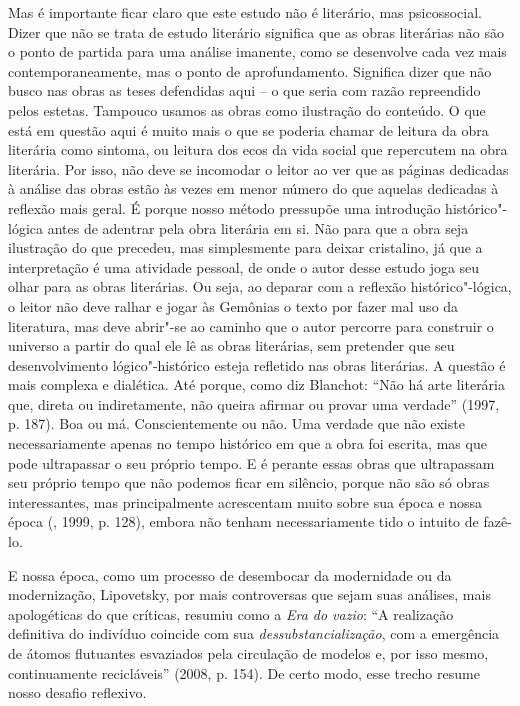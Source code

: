 Mas é importante ficar claro que este estudo não é literário, mas
psicossocial. Dizer que não se trata de estudo literário significa que
as obras literárias não são o ponto de partida para uma análise
imanente, como se desenvolve cada vez mais contemporaneamente, mas o
ponto de aprofundamento. Significa dizer que não busco nas obras as
teses defendidas aqui -- o que seria com razão repreendido pelos
estetas. Tampouco usamos as obras como ilustração do conteúdo. O que
está em questão aqui é muito mais o que se poderia chamar de leitura da
obra literária como sintoma, ou leitura dos ecos da vida social que
repercutem na obra literária. Por isso, não deve se incomodar o leitor
ao ver que as páginas dedicadas à análise das obras estão às vezes em
menor número do que aquelas dedicadas à reflexão mais geral. É porque
nosso método pressupõe uma introdução histórico"-lógica antes de adentrar
pela obra literária em si. Não para que a obra seja ilustração do que
precedeu, mas simplesmente para deixar cristalino, já que a
interpretação é uma atividade pessoal, de onde o autor desse estudo joga
seu olhar para as obras literárias. Ou seja, ao deparar com a reflexão
histórico"-lógica, o leitor não deve ralhar e jogar às Gemônias o texto
por fazer mal uso da literatura, mas deve abrir"-se ao caminho que o
autor percorre para construir o universo a partir do qual ele lê as
obras literárias, sem pretender que seu desenvolvimento lógico"-histórico
esteja refletido nas obras literárias. A questão é mais complexa e
dialética. Até porque, como diz Blanchot: ``Não há arte literária que,
direta ou indiretamente, não queira afirmar ou provar uma verdade''
(1997, p. 187). Boa ou má. Conscientemente ou não. Uma verdade que não
existe necessariamente apenas no tempo histórico em que a obra foi
escrita, mas que pode ultrapassar o seu próprio tempo. E é perante essas
obras que ultrapassam seu próprio tempo que não podemos ficar em
silêncio, porque não são só obras interessantes, mas principalmente
acrescentam muito sobre sua época e nossa época (, 1999, p. 128),
embora não tenham necessariamente tido o intuito de fazê-lo.

E nossa época, como um processo de desembocar da modernidade ou da
modernização, Lipovetsky, por mais controversas que sejam suas análises,
mais apologéticas do que críticas, resumiu como a \emph{Era do
vazio}: ``A realização definitiva do indivíduo coincide com sua
\emph{dessubstancialização}, com a emergência de átomos flutuantes
esvaziados pela circulação de modelos e, por isso mesmo, continuamente
recicláveis'' (2008, p. 154). De certo modo, esse trecho resume nosso
desafio reflexivo.

